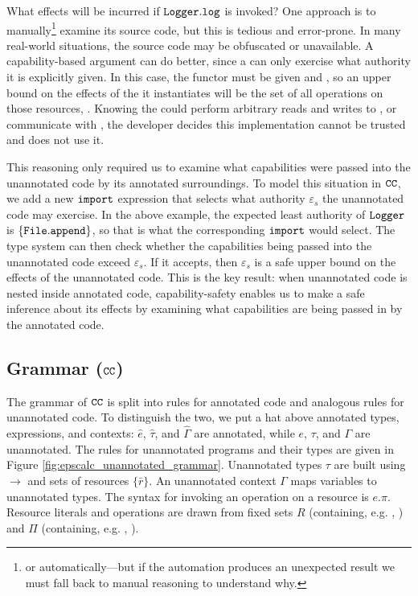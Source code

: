 What effects will be incurred if $\mathtt{Logger.log}$ is invoked? One
approach is to manually\footnote{or automatically---but if the
  automation produces an unexpected result we must fall back to manual
  reasoning to understand why.} examine its source code, but this is
tedious and error-prone. In many real-world situations, the source
code may be obfuscated or unavailable. A capability-based argument can do
better, since a  can only exercise what authority it is explicitly
given. In this case, the  functor must be given  and
, so an upper bound on the effects of the  it
instantiates will be the set of all operations on those resources,
. Knowing the  could perform
arbitrary reads and writes to , or communicate with , the developer decides this implementation cannot be trusted
and does not use it.

This reasoning only required us to examine what capabilities were passed into
the unannotated code by its annotated surroundings. To model this situation in
$\mathtt{CC}$, we add a new $\mathtt{import}$ expression
that selects what authority $\varepsilon_s$ the unannotated code may
exercise. In the above example, the expected least authority of
$\mathtt{Logger}$ is $\{ \mathtt{File.append} \}$, so that is what the
corresponding $\mathtt{import}$ would select. The type system can then
check whether the capabilities being passed into the unannotated code
exceed $\varepsilon_s$. If it accepts, then $\varepsilon_s$ is a safe
upper bound on the effects of the unannotated code. This is the
key result: when unannotated code is nested inside annotated code,
capability-safety enables us to make a safe inference about its
effects by examining what capabilities are being passed in by the
annotated code.

\vspace{-0.5cm}
\subsection{Grammar ($\mathtt{CC}$)}
\vspace{-0.2cm}

The grammar of $\mathtt{CC}$ is split into rules for annotated code and
analogous rules for unannotated code. To distinguish the two, we put a
hat above annotated types, expressions, and contexts: $\hat e$,
$\hat \tau$, and $\hat \Gamma$ are annotated, while $e$, $\tau$, and
$\Gamma$ are unannotated. The rules for unannotated programs and their
types are given in Figure
\ref{fig:epscalc_unannotated_grammar}. Unannotated types $\tau$ are
built using $\rightarrow$ and sets of resources $\{ \bar r \}$. An
unannotated context $\Gamma$ maps variables to unannotated types.
The syntax for invoking an operation on a resource is $e.\pi$. Resource
literals and operations are drawn from fixed sets $R$ (containing, e.g.
, ) and $\Pi$ (containing, e.g. ,
).

